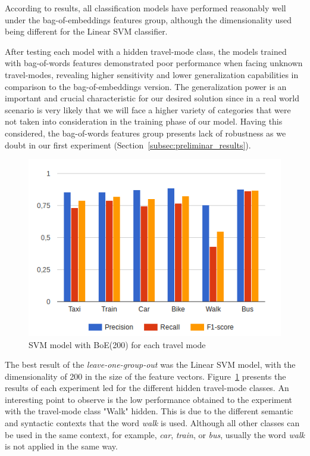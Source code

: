 According to results, all classification models have performed reasonably well under the bag-of-embeddings features group, although the dimensionality used being different for the Linear SVM classifier.

After testing each model with a hidden travel-mode class, the models trained with bag-of-words features demonstrated poor performance when facing unknown travel-modes, revealing higher sensitivity and lower generalization capabilities in comparison to the bag-of-embeddings version. The generalization power is an important and crucial characteristic for our desired solution since in a real world scenario is very likely that we will face a higher variety of categories that were not taken into consideration in the training phase of our model. Having this considered, the bag-of-words features group presents lack of robustness as we doubt in our first experiment (Section~\ref{subsec:preliminar_results}).

\begin{figure}[htbp]
	\centering
	\includegraphics[scale=0.7]{figures/svm_linear_leave_one_out_emb_200.png}
	\caption{SVM model with BoE(200) for each travel mode}
	\label{fig:svm_leave}
\end{figure}

The best result of the \emph{leave-one-group-out} was the Linear SVM model, with the dimensionality of 200 in the size of the feature vectors. Figure~\ref{fig:svm_leave} presents the results of each experiment led for the different hidden travel-mode classes. An interesting point to observe is the low performance obtained to the experiment with the travel-mode class "Walk" hidden. This is due to the different semantic and syntactic contexts that the word \emph{walk} is used. Although all other classes can be used in the same context, for example, \emph{car}, \emph{train}, or \emph{bus}, usually the word \emph{walk} is not applied in the same way.

